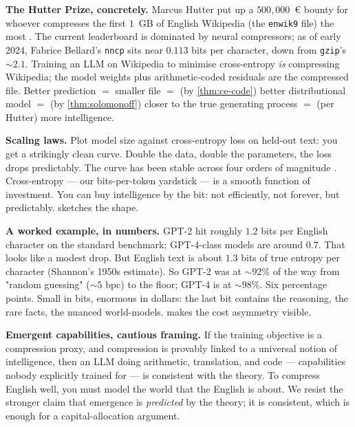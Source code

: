 \documentclass[12pt,a4paper]{article}
\theoremstyle{plain}
\theoremstyle{definition}
\begin{document}
\begin{intuition}
\textbf{The Hutter Prize, concretely.}  Marcus Hutter put up a
$500{,}000$~\euro{} bounty for whoever compresses the first $1$~GB
of English Wikipedia (the \texttt{enwik9} file) the most
\citep{hutter2005universal}.  The current leaderboard is dominated
by neural compressors; as of early $2024$, Fabrice Bellard's
\texttt{nncp} sits near $0.113$ bits per character, down from
\texttt{gzip}'s $\sim 2.1$.  Training an LLM on Wikipedia to
minimise cross-entropy \emph{is} compressing Wikipedia; the model
weights plus arithmetic-coded residuals are the compressed file.
Better prediction $=$ smaller file $=$ (by \cref{thm:ce-code})
better distributional model $=$ (by \cref{thm:solomonoff}) closer
to the true generating process $=$ (per Hutter) more intelligence.

\textbf{Scaling laws.}  Plot model size against cross-entropy loss
on held-out text: you get a strikingly clean curve.  Double the
data, double the parameters, the loss drops predictably.  The curve
has been stable across four orders of magnitude
\citep{kaplan2020scaling}.  Cross-entropy --- our bits-per-token
yardstick --- is a smooth function of investment.  You can buy
intelligence by the bit: not efficiently, not forever, but
predictably.   sketches the shape.

\textbf{A worked example, in numbers.}  GPT-2 hit roughly $1.2$
bits per English character on the standard benchmark; GPT-4-class
models are around $0.7$.  That looks like a modest drop.  But
English text is about $1.3$ bits of true entropy per character
(Shannon's 1950s estimate).  So GPT-2 was at $\sim 92\%$ of the
way from "random guessing" ($\sim 5$ bpc) to the floor; GPT-4 is
at $\sim 98\%$.  Six percentage points.  Small in bits, enormous
in dollars: the last bit contains the reasoning, the rare facts,
the nuanced world-models.   makes the cost
asymmetry visible.

\textbf{Emergent capabilities, cautious framing.}  If the training
objective is a compression proxy, and compression is provably
linked to a universal notion of intelligence, then an LLM doing
arithmetic, translation, and code --- capabilities nobody
explicitly trained for --- is consistent with the theory.  To
compress English well, you must model the world that the English
is about.  We resist the stronger claim that emergence is
\emph{predicted} by the theory; it is consistent, which is enough
for a capital-allocation argument.
\end{intuition}
\end{document}
